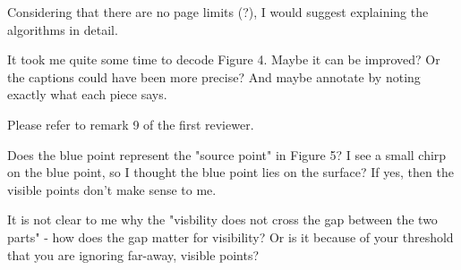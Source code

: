 \documentclass[10pt,french]{letter}
\begin{document}
  \begin{remark}
    Considering that there are no page limits (?), I would suggest explaining the
    algorithms in detail.
  \end{remark}
  \begin{remark}
    It took me quite some time to decode Figure 4. Maybe it can be improved? Or
    the captions could have been more precise? And maybe annotate by noting exactly
    what each piece says.
  \end{remark}
  \begin{response}
    Please refer to remark 9 of the first reviewer.
  \end{response}

  \begin{remark}
    Does the blue point represent the "source point" in Figure 5? I see a small
    chirp on the blue point, so I thought the blue point lies on the surface? If
    yes, then the visible points don't make sense to me.
  \end{remark}
  \begin{remark}
    It is not clear to me why the "visbility does not cross the gap between the
    two parts" - how does the gap matter for visibility? Or is it because of your
    threshold that you are ignoring far-away, visible points?
  \end{remark}
\end{document}
